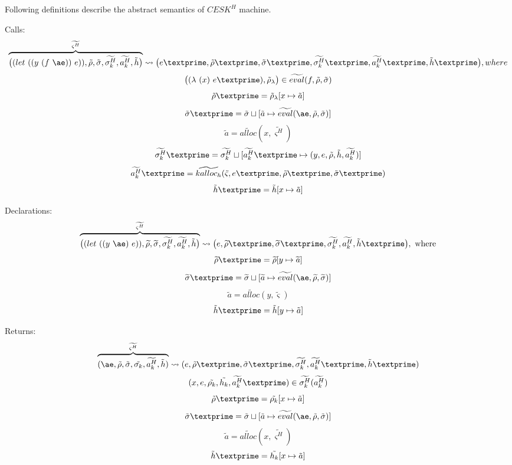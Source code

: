 \documentclass{article}
\begin{document}
Following definitions describe the abstract semantics of $CESK^H$ machine.

Calls:
\[
\overbrace{
\big((let\ ((y\ (f\ \ae))\ e)), \tilde{\rho}, \tilde{\sigma}, \widetilde{\sigma^H_k}, \widetilde{a^H_k}, \tilde{h} \big)
}^{\widetilde{\varsigma^H}}
\leadsto \big(e\textprime,\tilde{\rho}\textprime, \tilde{\sigma}\textprime, \widetilde{\sigma_k^H}\textprime, \widetilde{a_k^H}\textprime, \tilde{h}\textprime \big), where
\]
\[
\big((\lambda\ (x)\ e\textprime), \tilde{\rho}_{\lambda}  \big) \in \widetilde{eval}(f, \tilde{\rho}, \tilde{\sigma})
\]
\[
\tilde{\rho}\textprime = \tilde{\rho}_{\lambda}[x \mapsto \tilde{a}]
\]
\[
\tilde{\sigma}\textprime = \tilde{\sigma} \sqcup [\tilde{a} \mapsto \widetilde{eval}(\ae, \tilde{\rho}, \tilde{\sigma})]
\]
\[
\tilde{a} = \widetilde{alloc}(x, \widetilde{\varsigma^H})
\]
\[
\widetilde{\sigma_k^H}\textprime = \widetilde{\sigma_k^H} \sqcup [\widetilde{a_k^H}\textprime \mapsto {(y, e, \tilde{\rho}, \tilde{h}, \widetilde{a_k^H})}]
\]
\[
\widetilde{a_k^H}\textprime = \widetilde{kalloc_h}(\tilde{\varsigma}, e\textprime, \tilde{\rho}\textprime, \tilde{\sigma}\textprime)
\]
\[
\tilde{h}\textprime = \tilde{h}[x \mapsto \tilde{a}]
\]

Declarations:
\[
\overbrace{
\big((let\ ((y\ \ae)\ e)), \widetilde{\rho}, \widetilde{\sigma}, \widetilde{\sigma^H_k}, \widetilde{a^H_k}, \tilde{h} \big)
}^{\widetilde{\varsigma^H}}
\leadsto \big(e,\widetilde{\rho}\textprime, \widetilde{\sigma}\textprime, \widetilde{\sigma^H_k}, \widetilde{a^H_k}, \tilde{h}\textprime \big), \mbox{ where}
\]
\[
\widetilde{\rho}\textprime = \widetilde{\rho}[y \mapsto \widetilde{a}]
\]
\[
\widetilde{\sigma}\textprime = \widetilde{\sigma} \sqcup [\widetilde{a} \mapsto \widetilde{eval}(\ae, \widetilde{\rho}, \widetilde{\sigma})]
\]
\[
\widetilde{a} = \widetilde{alloc}(y, \widetilde{\varsigma})
\]
\[
\tilde{h}\textprime = \tilde{h}[y \mapsto \tilde{a}]
\]

Returns:
\[
\overbrace{
(\ae, \tilde{\rho}, \tilde{\sigma}, \tilde{\sigma_k}, \widetilde{a_k^H}, \tilde{h})
}^{\widetilde{\varsigma^H}}
\leadsto (e, \tilde{\rho}\textprime, \tilde{\sigma}\textprime, \widetilde{\sigma_k^H}, \widetilde{a_k^H}\textprime, \tilde{h}\textprime)
\]
\[
(x, e, \tilde{\rho_k}, \tilde{h_k}, \widetilde{a_k^H}\textprime) \in \widetilde{\sigma_k^H}(\widetilde{a_k^H})
\]
\[
\tilde{\rho}\textprime = \tilde{\rho_k}[x \mapsto \tilde{a}]
\]
\[
\tilde{\sigma}\textprime = \tilde{\sigma} \sqcup [\tilde{a} \mapsto \widetilde{eval}(\ae, \tilde{\rho}, \tilde{\sigma})]
\]
\[
\tilde{a} = \widetilde{alloc}(x, \widetilde{\varsigma^H})
\]
\[
\tilde{h}\textprime = \tilde{h_k}[x \mapsto \tilde{a}]
\]
\end{document}
